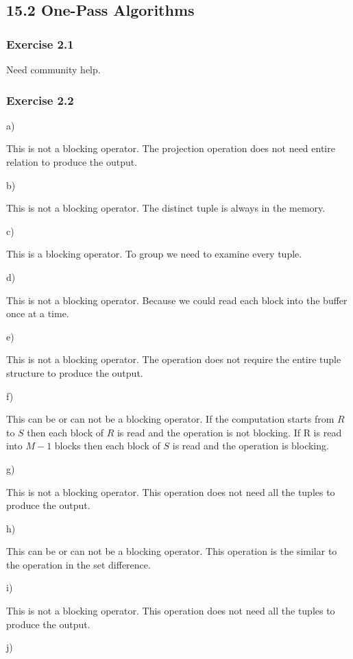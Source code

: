 \documentclass[../../main.tex]{subfiles}
\begin{document}
\subsection{15.2 One-Pass Algorithms}

\subsubsection*{Exercise 2.1}

Need community help.

\subsubsection*{Exercise 2.2}

a)

This is not a blocking operator. The projection operation does not need
entire relation to produce the output.

b)

This is not a blocking operator. The distinct tuple is always in the
memory.

c)

This is a blocking operator. To group we need to examine every tuple.

d)

This is not a blocking operator. Because we could read each
block into the buffer once at a time.

e)

This is not a blocking operator. The operation does not require the entire
tuple structure to produce the output.

f)

This can be or can not be a blocking operator. If the computation starts
from $R$ to $S$ then each block of $R$ is read and the operation is not blocking.
If R is read into $M-1$ blocks then each block of $S$ is read and the operation
is blocking.

g)

This is not a blocking operator. This operation does not need all the tuples
to produce the output.

h)

This can be or can not be a blocking operator. This operation is the similar
to the operation in the set difference.

i)

This is not a blocking operator. This operation does not need all the tuples
to produce the output.

j)
\end{document}
